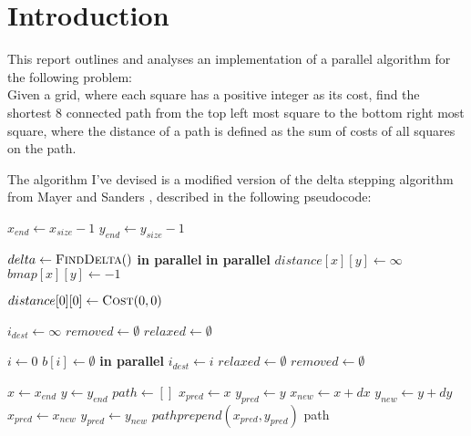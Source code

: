 \documentclass{article}
\begin{document}
\section*{Introduction}

This report outlines and analyses an implementation of a parallel algorithm for the following
problem:\\
Given a grid, where each square has a positive integer as its cost, find the shortest 8 connected
path from the top left most square to the bottom right most square, where the distance of a path is
defined as the sum of costs of all squares on the path.

The algorithm I've devised is a modified version of the delta stepping algorithm from Mayer and
Sanders \cite{Meyer-1998}, described in the following pseudocode:
\begin{algorithm}
	\begin{algorithmic}[1]
		\State \(x_{end}\gets x_{size} - 1\)
		\State \(y_{end}\gets y_{size} - 1\)

		\State \(delta\gets \Call{FindDelta}{ }\)
		\textbf{ in parallel}
			\textbf{ in parallel}
				\State $distance[x][y] \gets \infty$
				\State $bmap[x][y] \gets -1$ 
			\EndFor
		\EndFor

		\State \(distance[0][0]\gets \Call{Cost}{0, 0}\)
		\State {}

		\State $i_{dest} \gets \infty$
		\State $removed \gets \emptyset$
		\State $relaxed \gets \emptyset$

		\State $i \gets 0$
				\State {}
				\State $b[i] \gets \emptyset$
				 \textbf{in parallel}
					\State {}
						\State $i_{dest} \gets i$
					\EndIf
				\EndFor
			\EndWhile
			\State $relaxed \gets \emptyset$
			\State $removed \gets \emptyset$
		\EndWhile

		\State $x \gets x_{end}$
		\State $y \gets y_{end}$
		\State $path \gets []$
			\State $x_{pred} \gets x$
			\State $y_{pred} \gets y$
			\State $x_{new} \gets x + dx$
			\State $y_{new} \gets y + dy$
							\State $x_{pred} \gets x_{new}$
							\State $y_{pred} \gets y_{new}$
						\EndIf
					\EndIf
				\EndFor
			\EndFor
			\State $path prepend (x_{pred}, y_{pred})$
		\EndWhile
		\State \Return path
	\end{algorithmic}
\end{algorithm}
\end{document}
